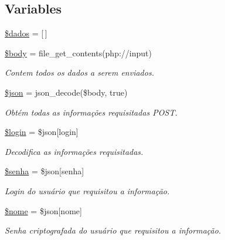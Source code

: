 \subsection*{Variables}
\begin{DoxyCompactItemize}
\item 
\hyperlink{menu_2configuracoes_2usuarios_2new_8php_a252370d95039a38fa11afab784725d58}{\$dados} = \mbox{[}$\,$\mbox{]}
\item 
\hyperlink{menu_2configuracoes_2usuarios_2new_8php_a26b9f9373f7bb79dfcf8a86dff086b45}{\$body} = file\+\_\+get\+\_\+contents(\textquotesingle{}php\+://input\textquotesingle{})
\begin{DoxyCompactList}\small\item\em Contem todos os dados a serem enviados. \end{DoxyCompactList}\item 
\hyperlink{menu_2configuracoes_2usuarios_2new_8php_acedd13b51401130848ce18f4d5c52605}{\$json} = json\+\_\+decode(\$body, true)
\begin{DoxyCompactList}\small\item\em Obtém todas as informações requisitadas P\+O\+ST. \end{DoxyCompactList}\item 
\hyperlink{menu_2configuracoes_2usuarios_2new_8php_afc31993e855f9631572adfedcfe6f34b}{\$login} = \$json\mbox{[}\textquotesingle{}login\textquotesingle{}\mbox{]}
\begin{DoxyCompactList}\small\item\em Decodifica as informações requisitadas. \end{DoxyCompactList}\item 
\hyperlink{menu_2configuracoes_2usuarios_2new_8php_a3678c8769c9698fd30581c1016c5f475}{\$senha} = \$json\mbox{[}\textquotesingle{}senha\textquotesingle{}\mbox{]}
\begin{DoxyCompactList}\small\item\em Login do usuário que requisitou a informação. \end{DoxyCompactList}\item 
\hyperlink{menu_2configuracoes_2usuarios_2new_8php_ac8c9d9dd5d90fa5854f0cb8397084ebd}{\$nome} = \$json\mbox{[}\textquotesingle{}nome\textquotesingle{}\mbox{]}
\begin{DoxyCompactList}\small\item\em Senha criptografada do usuário que requisitou a informação. \end{DoxyCompactList}\item 

\end{DoxyCompactItemize}
